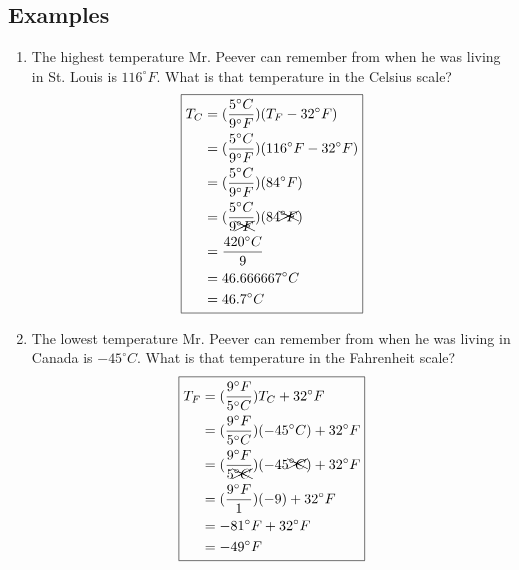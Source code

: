 \documentclass[11pt, oneside]{article}   	%
\begin{document}
\subsection{Examples}
\begin{enumerate}[label=Example \arabic*]
\item The highest temperature Mr. Peever can remember from when he was living in St. Louis is  $116^{\circ} F$. What is that temperature in the Celsius scale?
\begin{equation} 
\boxed{
\begin{split}
    T_C &= (\frac{5^{\circ} C}{9^{\circ} F}) (T_F - 32^{\circ} F) \\
            &= (\frac{5^{\circ} C}{9^{\circ} F}) (116^{\circ} F - 32^{\circ} F) \\
            &= (\frac{5^{\circ} C}{9^{\circ} F}) (84^{\circ} F) \\
            &= (\frac{5^{\circ} C}{9\xcancel{^{\circ} F}}) (84\xcancel{^{\circ} F}) \\
            &= \frac{420^{\circ} C}{9} \\
            &= 46.666667^{\circ} C \\
            &= 46.7^{\circ} C \\
 \end{split}
 }
 \end{equation}

 \item The lowest temperature Mr. Peever can remember from when he was living in Canada is  $-45^{\circ} C$. What is that temperature in the Fahrenheit scale?
\begin{equation} 
\boxed{
\begin{split}
    T_F  &= (\frac{9^{\circ} F}{5^{\circ} C}) T_C + 32^{\circ} F \\
            &=  (\frac{9^{\circ} F}{5^{\circ} C}) (-45 ^{\circ} C) + 32^{\circ} F \\
            &= (\frac{9^{\circ} F}{5\xcancel{^{\circ} C}}) (-45\xcancel{^{\circ} C})  + 32^{\circ} F \\
            &= (\frac{9^{\circ} F}{1}) (-9)  + 32^{\circ} F \\
            &= -81^{\circ} F + 32^{\circ} F \\
            &= -49^{\circ} F \\
 \end{split}
 }
 \end{equation}
 

\end{enumerate}
\end{document}
